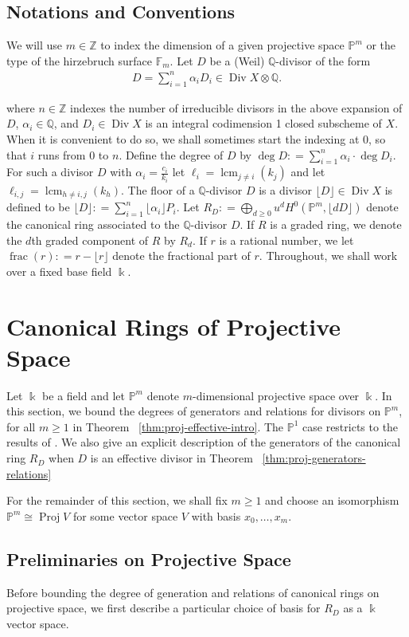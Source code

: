 \documentclass{amsart}
\theoremstyle{plain}
\theoremstyle{definition}
\theoremstyle{remark}
\numberwithin{equation}{section}
\newcommand\ssec{\subsection}
\newcommand\bq{{\mathbb Q}}
\newcommand\bp{{\mathbb P}}
\newcommand\bz{{\mathbb Z}}
\newcommand\bk{{\Bbbk}}
\DeclareMathOperator\di{Div}
\newcommand\hirz{\mathbb{F}}
\DeclareMathOperator{\fr}{frac}
\DeclareMathOperator{\proj}{Proj}
\DeclareMathOperator{\lcm}{lcm}
\begin{document}
\ssec{Notations and Conventions}
We will use $m \in \bz$ to index the dimension of a given projective
space $\bp^m$ or the type of the hirzebruch surface $\hirz_m$.
Let $D$ be a (Weil) $\bq$-divisor of the form
\begin{align*}
	D = \sum_{i=1}^{n}\alpha_i D_i \in \di X \otimes \bq.
\end{align*}

\noindent
where $n \in \bz$ indexes the number of irreducible divisors in 
the above expansion of $D$, $\alpha_i \in \bq$, and $D_i \in \di X$ is an integral
codimension 1 closed subscheme of $X$. When it is convenient to do
so, we shall sometimes start the indexing at $0$, so that $i$ runs
from $0$ to $n$. Define the degree of $D$ by $\deg D \colon =
\sum_{i=1}^{n}\alpha_i \cdot \deg D_i$. For such a divisor $D$ with $\alpha_i =
\frac{c_i}{k_i}$ let $\ell_i = \lcm_{j\ne i}(k_j)$
and let $\ell_{i,j} = \lcm_{h\ne i,j}(k_h).$ The floor of a $\bq$-divisor $D$ is a divisor $\lfloor D
\rfloor \in \di X$ is defined to be $\lfloor D \rfloor \colon = \sum_{i = 1}^{n}
\lfloor \alpha_i \rfloor P_i$. Let $
	R_D \colon = \bigoplus_{d \geq 0} u^d H^0(\bp^m, \lfloor dD \rfloor)$
denote the canonical ring associated to the $\bq$-divisor $D$. If $R$
is a graded ring, we denote the $d$th graded component of $R$ by $R_d$. If $r$ is a rational number, we let
$\fr(r) \colon = r - \lfloor r
\rfloor$ denote the fractional part of $r$. Throughout, we
shall work over a fixed base field $\bk$.


\section{Canonical Rings of Projective Space}
\label{sec:proj}
Let $\bk$ be a field and let $\bp^m$ denote $m$-dimensional
projective space over $\bk$. In this section, we bound the degrees
of generators and relations for divisors
on $\bp^m$, for all $m \geq 1$ in Theorem
~\ref{thm:proj-effective-intro}. 
The $\bp^1$ case restricts to the results of
\cite{dorney:canonical}. We also give an explicit description of the
generators of the canonical ring $R_D$ when $D$ is an effective divisor in Theorem ~\ref{thm:proj-generators-relations}


For the remainder of this section, we shall fix $m \geq 1$ and
choose an
isomorphism $\bp^m \cong \proj V$ for some vector space $V$ with
basis $x_0,\ldots, x_m$.

\ssec{Preliminaries on Projective Space}
Before bounding the degree of generation and relations of
canonical rings on projective space, we first
describe a particular choice of basis for $R_D$ as a $\bk$ vector
space.
\end{document}
